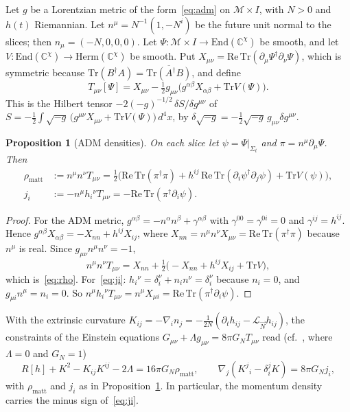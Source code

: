\documentclass[11pt,a4paper,reqno]{amsart}
\newtheorem{proposition}[theorem]{Proposition}
\theoremstyle{definition}
\numberwithin{equation}{section}
\newcommand{\C}{\mathbb{C}}
\newcommand{\Tr}{\mathrm{Tr}}
\newcommand{\End}{\mathrm{End}}
\begin{document}
Let $g$ be a Lorentzian metric of the form~\eqref{eq:adm} on $\mathcal{M}\times I$, with $N>0$ and $h(t)$ Riemannian. Let $n^\mu=N^{-1}(1,-N^i)$ be the future unit normal to the slices; then $n_\mu=(-N,0,0,0)$. Let $\Psi:\mathcal{M}\times I\to\End(\C^\chi)$ be smooth, and let $V:\End(\C^\chi)\to\mathrm{Herm}(\C^\chi)$ be smooth. Put $X_{\mu\nu}=\mathrm{Re}\,\Tr(\partial_\mu\Psi^\dagger\partial_\nu\Psi)$, which is symmetric because $\Tr(B^\dagger A)=\overline{\Tr(A^\dagger B)}$, and define
\begin{equation}\label{eq:tmunu}
    T_{\mu\nu}[\Psi]=X_{\mu\nu}-\tfrac12 g_{\mu\nu}\big(g^{\alpha\beta}X_{\alpha\beta}+\Tr V(\Psi)\big).
\end{equation}
This is the Hilbert tensor $-2(-g)^{-1/2}\,\delta S/\delta g^{\mu\nu}$ of $S=-\tfrac12\int\sqrt{-g}\,\big(g^{\mu\nu}X_{\mu\nu}+\Tr V(\Psi)\big)\,d^4x$, by $\delta\sqrt{-g}=-\tfrac12\sqrt{-g}\,g_{\mu\nu}\delta g^{\mu\nu}$.

\begin{proposition}[ADM densities]\label{prop:densities}
On each slice let $\psi=\Psi|_{\Sigma_t}$ and $\pi=n^\mu\partial_\mu\Psi$. Then
\begin{align}
    \rho_{\mathrm{matt}}&:=n^\mu n^\nu T_{\mu\nu}=\tfrac12\Big(\mathrm{Re}\,\Tr(\pi^\dagger\pi)+h^{ij}\,\mathrm{Re}\,\Tr(\partial_i\psi^\dagger\partial_j\psi)+\Tr V(\psi)\Big),\label{eq:rho}\\
    j_i&:=-n^\mu h_i{}^{\nu}T_{\mu\nu}=-\mathrm{Re}\,\Tr(\pi^\dagger\partial_i\psi).\label{eq:ji}
\end{align}
\end{proposition}

\begin{proof}
For the ADM metric, $g^{\alpha\beta}=-n^\alpha n^\beta+\gamma^{\alpha\beta}$ with $\gamma^{00}=\gamma^{0i}=0$ and $\gamma^{ij}=h^{ij}$. Hence $g^{\alpha\beta}X_{\alpha\beta}=-X_{nn}+h^{ij}X_{ij}$, where $X_{nn}=n^\mu n^\nu X_{\mu\nu}=\mathrm{Re}\,\Tr(\pi^\dagger\pi)$ because $n^\mu$ is real. Since $g_{\mu\nu}n^\mu n^\nu=-1$,
\[
n^\mu n^\nu T_{\mu\nu}=X_{nn}+\tfrac12\big(-X_{nn}+h^{ij}X_{ij}+\Tr V\big),
\]
which is~\eqref{eq:rho}. For~\eqref{eq:ji}: $h_i{}^\nu=\delta_i^\nu+n_in^\nu=\delta_i^\nu$ because $n_i=0$, and $g_{\mu i}n^\mu=n_i=0$. So $n^\mu h_i{}^\nu T_{\mu\nu}=n^\mu X_{\mu i}=\mathrm{Re}\,\Tr(\pi^\dagger\partial_i\psi)$.
\end{proof}

With the extrinsic curvature $K_{ij}=-\nabla_in_j=-\frac{1}{2N}(\partial_th_{ij}-\mathcal{L}_{\vec N}h_{ij})$, the constraints of the Einstein equations $G_{\mu\nu}+\Lambda g_{\mu\nu}=8\pi G_NT_{\mu\nu}$ read (cf.~\cite[Ch.~5]{gourgoulhon2012}, where $\Lambda=0$ and $G_N=1$)
\begin{equation}\label{eq:constraints}
    R[h]+K^2-K_{ij}K^{ij}-2\Lambda=16\pi G_N\rho_{\mathrm{matt}},\qquad \nabla_j(K^j{}_i-\delta^j_iK)=8\pi G_N j_i,
\end{equation}
with $\rho_{\mathrm{matt}}$ and $j_i$ as in Proposition~\ref{prop:densities}. In particular, the momentum density carries the minus sign of~\eqref{eq:ji}.
\end{document}
